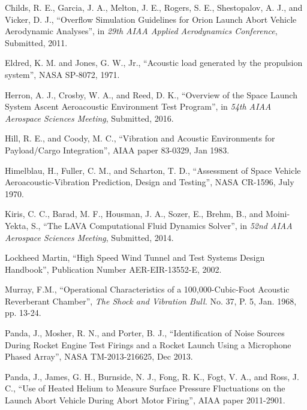 \documentclass[]{aiaa-tc}%
\begin{document}
\begin{thebibliography}{99}%

Childs, R. E., Garcia, J. A., Melton, J. E., Rogers, S. E., Shestopalov, A. J., and Vicker, D. J., ``Overflow Simulation Guidelines for Orion Launch
Abort Vehicle Aerodynamic Analyses'', in {\it 29th AIAA Applied Aerodynamics Conference}, Submitted, 2011.

Eldred, K. M. and Jones, G. W., Jr., ``Acoustic load generated by the propulsion system'', NASA SP-8072, 1971.

Herron, A. J., Crosby, W. A., and Reed, D. K., ``Overview of the Space Launch System Ascent Aeroacoustic Environment Test Program'', in {\it 54th AIAA Aerospace Sciences Meeting}, Submitted, 2016.

Hill, R. E., and Coody, M. C., ``Vibration and Acoustic Environments for Payload/Cargo Integration'', AIAA paper 83-0329, Jan 1983.

Himelblau, H., Fuller, C. M., and Scharton, T. D., ``Assessment of Space Vehicle Aeroacoustic-Vibration Prediction, Design and Testing'', NASA CR-1596, July 1970.

Kiris, C. C., Barad, M. F., Housman, J. A., Sozer, E., Brehm, B., and Moini-Yekta, S.,  ``The LAVA Computational Fluid Dynamics Solver'', in {\it 52nd AIAA Aerospace Sciences Meeting}, Submitted, 2014.

Lockheed Martin,  ``High Speed Wind Tunnel and Test Systems Design Handbook'', Publication Number AER-EIR-13552-E, 2002.

Murray, F.M.,  ``Operational Characteristics of a 100,000-Cubic-Foot Acoustic Reverberant Chamber'', {\it The Shock and Vibration Bull.} No. 37, P. 5, Jan. 1968, pp. 13-24.

Panda, J., Mosher, R. N., and Porter, B. J., ``Identification of Noise Sources During Rocket Engine Test Firings and a Rocket Launch Using a Microphone Phased Array'', NASA TM-2013-216625, Dec 2013.

Panda, J., James, G. H., Burnside, N. J., Fong, R. K., Fogt, V. A., and Ross, J. C., ``Use of Heated Helium to Measure Surface Pressure Fluctuations on the Launch Abort Vehicle During Abort Motor Firing'', AIAA paper 2011-2901.


\end{thebibliography}
\end{document}
